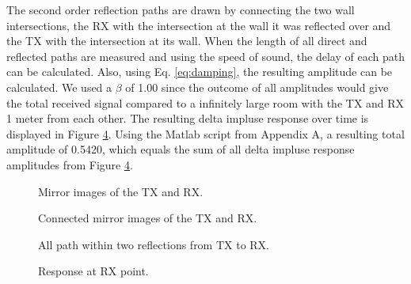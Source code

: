 \documentclass[final]{scrreprt} %
\begin{document}
The second order reflection paths are drawn by connecting the two wall intersections, the RX with the intersection at the wall it was reflected over and the TX with the intersection at its wall.
When the length of all direct and reflected paths are measured and using the speed of sound, the delay of each path can be calculated.
Also, using Eq. \ref{eq:damping}, the resulting amplitude can be calculated.
We used a $\beta$ of 1.00 since the outcome of all amplitudes would give the total received signal compared to a infinitely large room with the TX and RX 1 meter from each other.
The resulting delta impluse response over time is displayed in Figure \ref{fig:response}.
Using the Matlab script from Appendix A, a resulting total amplitude of 0.5420, which equals the sum of all delta impluse response amplitudes from Figure \ref{fig:response}.

\begin{figure}[H]
	\centering
	\setlength\figureheight{6cm}
    	\setlength\figurewidth{6cm}
	
	\caption{Mirror images of the TX and RX.}
	\label{fig:mirror}
\end{figure}

\begin{figure}[H]
	\centering
	\setlength\figureheight{6cm}
    	\setlength\figurewidth{6cm}
	
	\caption{Connected mirror images of the TX and RX.}
	\label{fig:connected}
\end{figure}

\begin{figure}[H]
	\centering
	\setlength\figureheight{6cm}
    	\setlength\figurewidth{6cm}
	
	\caption{All path within two reflections from TX to RX.}
	\label{fig:reflections}
\end{figure}

\begin{figure}[H]
	\centering
	\setlength\figureheight{4cm}
    	\setlength{}
	
	\caption{Response at RX point.}
	\label{fig:response}
\end{figure}
\end{document}
